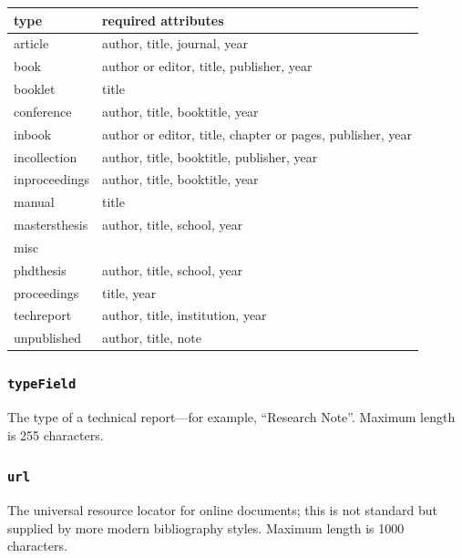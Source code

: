 \documentclass[letterpaper,10pt,english]{sphinxmanual}
\begin{document}
\begin{tabulary}{\linewidth}{|L|L|}
\hline
\textbf{
type
} & \textbf{
required attributes
}\\\hline

article
 & 
author, title, journal, year
\\\hline

book
 & 
author or editor, title, publisher, year
\\\hline

booklet
 & 
title
\\\hline

conference
 & 
author, title, booktitle, year
\\\hline

inbook
 & 
author or editor, title, chapter or pages, publisher, year
\\\hline

incollection
 & 
author, title, booktitle, publisher, year
\\\hline

inproceedings
 & 
author, title, booktitle, year
\\\hline

manual
 & 
title
\\\hline

mastersthesis
 & 
author, title, school, year
\\\hline

misc
 & \\\hline

phdthesis
 & 
author, title, school, year
\\\hline

proceedings
 & 
title, year
\\\hline

techreport
 & 
author, title, institution, year
\\\hline

unpublished
 & 
author, title, note
\\\hline
\end{tabulary}



\subsubsection{\texttt{typeField}}
\label{datastructure:typefield}
The type of a technical report---for example, ``Research Note''.  Maximum length
is 255 characters.


\subsubsection{\texttt{url}}
\label{datastructure:id47}
The universal resource locator for online documents; this is not standard but
supplied by more modern bibliography styles.  Maximum length is 1000 characters.
\end{document}

